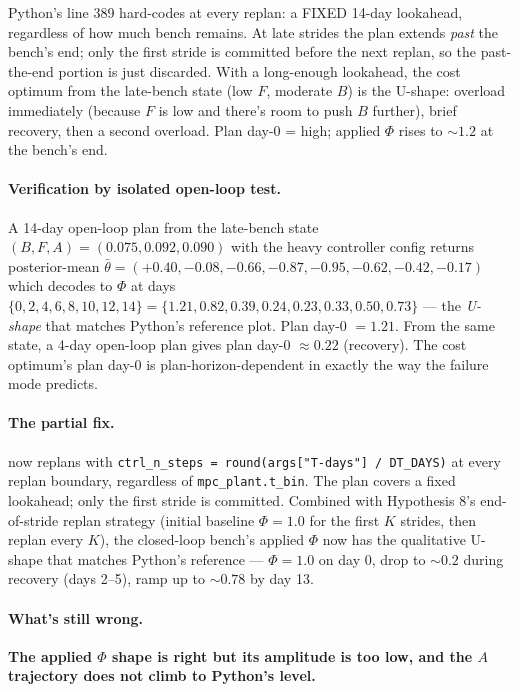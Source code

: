 \documentclass[11pt,a4paper]{article}
\begin{document}
Python's  line 389 hard-codes
 at every replan: a FIXED 14-day
lookahead, regardless of how much bench remains. At late strides the
plan extends \emph{past} the bench's end; only the first stride is
committed before the next replan, so the past-the-end portion is just
discarded.  With a long-enough lookahead, the cost optimum from the
late-bench state (low $F$, moderate $B$) is the U-shape: overload
immediately (because $F$ is low and there's room to push $B$ further),
brief recovery, then a second overload. Plan day-0 = high; applied
$\Phi$ rises to $\sim 1.2$ at the bench's end.

\paragraph{Verification by isolated open-loop test.}
A 14-day open-loop plan from the late-bench state $(B, F, A) =
(0.075, 0.092, 0.090)$ with the heavy controller config returns
posterior-mean
$\bar\theta = (+0.40, -0.08, -0.66, -0.87, -0.95, -0.62, -0.42, -0.17)$
which decodes to $\Phi$ at days $\{0, 2, 4, 6, 8, 10, 12, 14\} =
\{1.21, 0.82, 0.39, 0.24, 0.23, 0.33, 0.50, 0.73\}$ --- the
\emph{U-shape} that matches Python's reference plot. Plan day-0
$= 1.21$. From the same state, a 4-day open-loop plan gives plan
day-0 $\approx 0.22$ (recovery). The cost optimum's plan day-0 is
plan-horizon-dependent in exactly the way the failure mode predicts.

\paragraph{The partial fix.}
 now replans
with \texttt{ctrl\_n\_steps = round(args["T-days"] / DT\_DAYS)} at
every replan boundary, regardless of \texttt{mpc\_plant.t\_bin}. The
plan covers a fixed lookahead; only the first stride is committed.
Combined with Hypothesis 8's end-of-stride replan strategy (initial
baseline $\Phi=1.0$ for the first $K$ strides, then replan every $K$),
the closed-loop bench's applied $\Phi$ now has the qualitative
U-shape that matches Python's reference --- $\Phi = 1.0$ on day 0,
drop to $\sim 0.2$ during recovery (days 2--5), ramp up to $\sim 0.78$
by day 13.

\paragraph{What's still wrong.}
\textbf{The applied $\Phi$ shape is right but its amplitude is too low,
and the $A$ trajectory does not climb to Python's level.}
\end{document}
